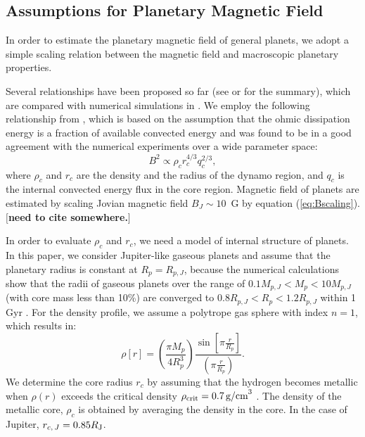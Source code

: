\documentclass{emulateapj}
\def\memoYF#1{\color{red}$[${\bf #1}$]$ \color{black}}
\begin{document}
\subsection{Assumptions for Planetary Magnetic Field}
\label{ss:magneticfield}

In order to estimate the planetary magnetic field of general planets, we adopt a simple scaling relation between the magnetic field and macroscopic planetary properties. 

Several relationships have been proposed so far \citep[e.g.][]{russel1978,busse1976,stevenson1979,mizutani1992,sano1993,starchenko2002,christensen2006} %
(see \citet{griesmeier2004} or \citet{christensen2010} for the summary), which are compared with numerical simulations in \citet{christensen2010}. 
We employ the following relationship from \citet{christensen2006}, which is based on the assumption that the ohmic dissipation energy is a fraction of available convected energy and was found to be in a good agreement with the numerical experiments over a wide parameter space: 
\begin{equation}
B^2 \propto \rho_c r_c^{4/3} q_c^{2/3}, \label{eq:Bscaling} 
\end{equation}
where $\rho _c$ and $r_c$ are the density and the radius of the dynamo region, and $q_c$ is the internal convected energy flux in the core region. 
Magnetic field of planets are estimated by scaling Jovian magnetic field $B_J \sim 10$~G by equation (\ref{eq:Bscaling}). 
\memoYF{need to cite \citet{reiners2010} somewhere.}

In order to evaluate $\rho _c $ and $r_c$, we need a model of internal structure of planets. 
In this paper, we consider Jupiter-like gaseous planets and assume that the planetary radius is constant at $R_p = R_{p,J}$, because the numerical calculations show that the radii of gaseous planets over the range of $0.1 M_{p, J} < M_p < 10M_{p, J}$ (with core mass less than 10\%) are converged to $0.8 R_{p, J} < R_p < 1.2R_{p, J}$ within 1 Gyr \citep{fortney2007}. 
For the density profile, we assume a polytrope gas sphere with index $n=1$, which results in:
\begin{equation}
\rho [r] = \left( \frac{\pi M_p}{4 R_p^3} \right) \frac{\sin \left[ \pi \frac{r}{R_p} \right]}{\left( \pi \frac{r}{R_p} \right)}. \label{eq:rho_r}
\end{equation}
We determine the core radius $r_c$ by assuming that the hydrogen becomes metallic when $\rho (r)$ exceeds the critical density $\rho_{\rm crit}=0.7\,\mbox{g/cm}^3$ \citep{exoplanets2006, griesmeier2007b}. The density of the metallic core, $\rho _c$ is obtained by averaging the density in the core. 
In the case of Jupiter, $r_{c,\,J} = 0.85 R_{\rm J}$.  
\end{document}
